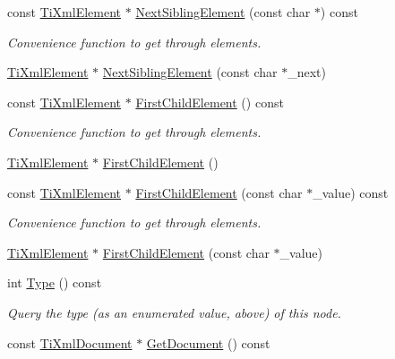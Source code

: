 \begin{DoxyCompactItemize}
\item 
const \hyperlink{classTiXmlElement}{TiXmlElement} $\ast$ \hyperlink{classTiXmlNode_a3d7897999f99cf4870dd59df6331d7ff}{NextSiblingElement} (const char $\ast$) const 
\begin{DoxyCompactList}\small\item\em Convenience function to get through elements. \item\end{DoxyCompactList}\item 
\hyperlink{classTiXmlElement}{TiXmlElement} $\ast$ \hyperlink{classTiXmlNode_a6e1ac6b800e18049bc75e9f8e63a8e5f}{NextSiblingElement} (const char $\ast$\_\-next)
\item 
const \hyperlink{classTiXmlElement}{TiXmlElement} $\ast$ \hyperlink{classTiXmlNode_ab1f8d8e70d88aea4c5efedfe00862d55}{FirstChildElement} () const 
\begin{DoxyCompactList}\small\item\em Convenience function to get through elements. \item\end{DoxyCompactList}\item 
\hyperlink{classTiXmlElement}{TiXmlElement} $\ast$ \hyperlink{classTiXmlNode_aa0fecff1f3866ab33a8a25506e95db1d}{FirstChildElement} ()
\item 
const \hyperlink{classTiXmlElement}{TiXmlElement} $\ast$ \hyperlink{classTiXmlNode_a0ec361bfef1cf1978d060295f597e0d9}{FirstChildElement} (const char $\ast$\_\-value) const 
\begin{DoxyCompactList}\small\item\em Convenience function to get through elements. \item\end{DoxyCompactList}\item 
\hyperlink{classTiXmlElement}{TiXmlElement} $\ast$ \hyperlink{classTiXmlNode_a6936ae323675071808ac4840379e57f5}{FirstChildElement} (const char $\ast$\_\-value)
\item 
int \hyperlink{classTiXmlNode_a57b99d5c97d67a42b9752f5210a1ba5e}{Type} () const 
\begin{DoxyCompactList}\small\item\em Query the type (as an enumerated value, above) of this node. \item\end{DoxyCompactList}\item 
const \hyperlink{classTiXmlDocument}{TiXmlDocument} $\ast$ \hyperlink{classTiXmlNode_aa66f4ebcd175204a168ed7c2d7b43071}{GetDocument} () const 

\end{DoxyCompactItemize}
